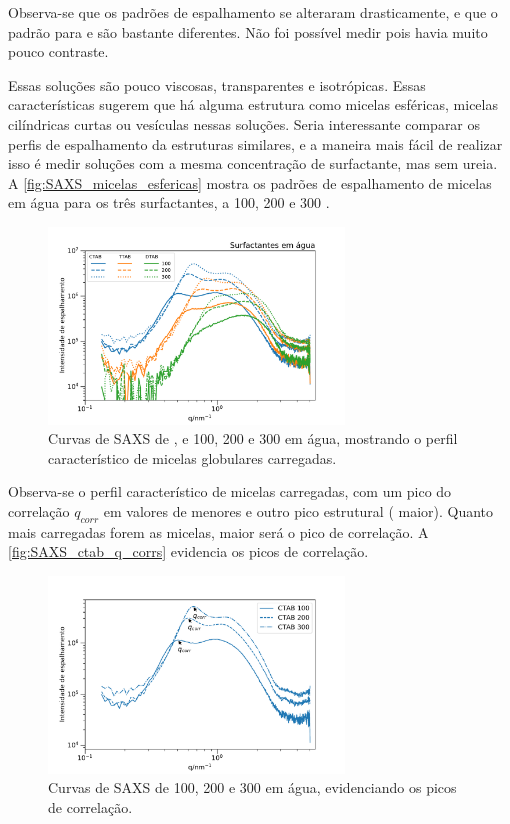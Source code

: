 	Observa-se que os padrões de espalhamento se alteraram drasticamente, e que o padrão para \CTAB{} e \TTAB{} são bastante diferentes. Não foi possível medir \DTAB{} pois havia muito pouco contraste.
	
	Essas soluções são pouco viscosas, transparentes e isotrópicas. Essas características sugerem que há alguma estrutura como micelas esféricas, micelas cilíndricas curtas ou vesículas nessas soluções. Seria interessante comparar os perfis de espalhamento da estruturas similares, e a maneira mais fácil de realizar isso é medir soluções com a mesma concentração de surfactante, mas sem ureia. A \autoref{fig:SAXS_micelas_esfericas} mostra os padrões de espalhamento de micelas em água para os três surfactantes, a 100, 200 e 300 \mM.
	
	\begin{figure}[h]
		\centering
		\includegraphics[width=0.7\textwidth]{imagens/saxs/micelas_esfericas}
		\caption{Curvas de SAXS de \CTAB, \TTAB{} e \DTAB{} 100, 200 e 300 \mM{} em água, mostrando o perfil característico de micelas globulares carregadas.}
		\label{fig:SAXS_micelas_esfericas}
	\end{figure}  %
	
	Observa-se o perfil característico de micelas carregadas, com um pico do correlação \(q_{corr}\) em valores de \q{} menores e outro pico estrutural (\q{} maior). Quanto mais carregadas forem as micelas, maior será o pico de correlação. A \autoref{fig:SAXS_ctab_q_corrs} evidencia os picos de correlação. 
	
	\begin{figure}[h]
		\centering
		\includegraphics[width=0.7\textwidth]{imagens/saxs/CTAB_q_corrs}
		\caption{Curvas de SAXS de \CTAB{} 100, 200 e 300 \mM{} em água, evidenciando os picos de correlação.}
		\label{fig:SAXS_ctab_q_corrs}
	\end{figure}

